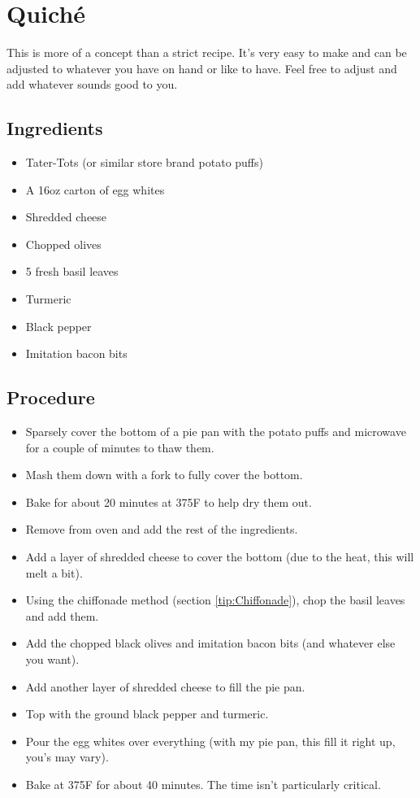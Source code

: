 \documentclass[10pt, openany]{book}
\begin{document}
\section{Quich\'e}
This is more of a concept than a strict recipe.  It's very easy to make and can be adjusted to whatever you have on hand or like to have.  Feel free to adjust and add whatever sounds good to you.
\subsection{Ingredients}
\begin{itemize}
  \item Tater-Tots\textsuperscript{\textregistered} (or similar store brand potato puffs)
  \item A 16oz carton of egg whites
  \item Shredded cheese
  \item Chopped olives
  \item 5 fresh basil leaves
  \item Turmeric
  \item Black pepper
  \item Imitation bacon bits
\end{itemize}
\subsection{Procedure}
\begin{itemize}
  \item Sparsely cover the bottom of a pie pan with the potato puffs and microwave for a couple of minutes to thaw them.
  \item Mash them down with a fork to fully cover the bottom.
  \item Bake for about 20 minutes at 375\degree{}F to help dry them out.
  \item Remove from oven and add the rest of the ingredients.
  \item Add a layer of shredded cheese to cover the bottom (due to the heat, this will melt a bit).
  \item Using the chiffonade method (section \ref{tip:Chiffonade}), chop the basil leaves and add them.
  \item Add the chopped black olives and imitation bacon bits (and whatever else you want).
  \item Add another layer of shredded cheese to fill the pie pan.
  \item Top with the ground black pepper and turmeric.
  \item Pour the egg whites over everything (with my pie pan, this fill it right up, you's may vary).
  \item Bake at 375\degree{}F for about 40 minutes.  The time isn't particularly critical.
\end{itemize}
\end{document}
